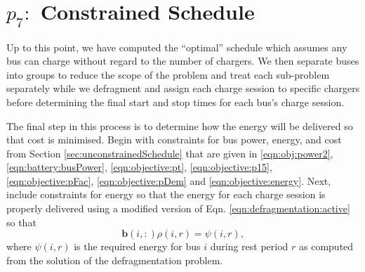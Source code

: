 \section{$p_7:$ Constrained Schedule\label{sec:constrainedSchedule}}
Up to this point, we have computed the ``optimal'' schedule which assumes any bus can charge without regard to the number of chargers. We then separate buses into groups to reduce the scope of the problem and treat each sub-problem separately while we defragment and assign each charge session to specific chargers before determining the final start and stop times for each bus's charge session.
\par The final step in this process is to determine how the energy will be delivered so that cost is minimised. Begin with constraints for bus power, energy, and cost from Section \ref{sec:unconstrainedSchedule} that are given in \eqref{eqn:obj:power2}, \eqref{eqn:battery:busPower}, \eqref{eqn:objective:pt}, \eqref{eqn:objective:p15}, \eqref{eqn:objective:pFac}, \eqref{eqn:objective:pDem} and \eqref{eqn:objective:energy}. Next, include constraints for energy so that the energy for each charge session is properly delivered using a modified version of Eqn. \eqref{eqn:defragmentation:active} so that
\begin{equation}\label{eqn:constrainedSchedule:modified}
	\mathbf{b}(i,:)\rho(i,r) = \psi(i,r),
\end{equation}
where $\psi(i,r)$ is the required energy for bus $i$ during rest period $r$ as computed from the solution of the defragmentation problem.
\\[0.1in] 

